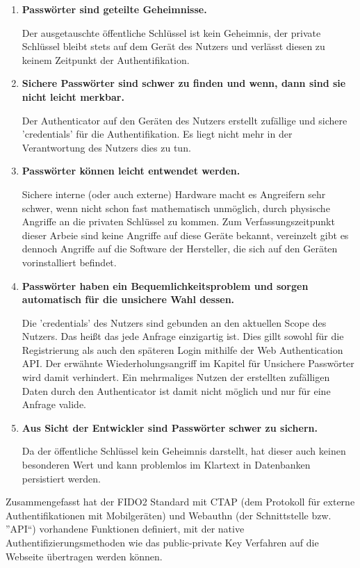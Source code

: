 \begin{enumerate} 
\item \textbf{Passwörter sind geteilte Geheimnisse.}

Der ausgetauschte öffentliche Schlüssel ist kein Geheimnis, der private Schlüssel bleibt stets auf dem Gerät des Nutzers und verlässt diesen zu keinem Zeitpunkt der Authentifikation.

\item \textbf{Sichere Passwörter sind schwer zu finden und wenn, dann sind sie nicht leicht merkbar.}

Der Authenticator auf den Geräten des Nutzers erstellt zufällige und sichere 'credentials' für die Authentifikation. Es liegt nicht mehr in der Verantwortung des Nutzers dies zu tun.

\item \textbf{Passwörter können leicht entwendet werden.}

Sichere interne (oder auch externe) Hardware macht es Angreifern sehr schwer, wenn nicht schon fast mathematisch unmöglich, durch physische Angriffe an die privaten Schlüssel zu kommen. Zum Verfassungszeitpunkt dieser Arbeie sind keine Angriffe auf diese Geräte bekannt, vereinzelt gibt es dennoch Angriffe auf die Software der Hersteller, die sich auf den Geräten vorinstalliert befindet.

\item \textbf{Passwörter haben ein Bequemlichkeitsproblem und sorgen automatisch für die unsichere Wahl dessen.}

Die 'credentials' des Nutzers sind gebunden an den aktuellen Scope des Nutzers. Das heißt das jede Anfrage einzigartig ist. Dies gillt sowohl für die Registrierung als auch den späteren Login mithilfe der Web Authentication API. Der erwähnte Wiederholungsangriff im Kapitel für Unsichere Passwörter wird damit verhindert. Ein mehrmaliges Nutzen der erstellten zufälligen Daten durch den Authenticator ist damit nicht möglich und nur für eine Anfrage valide.

\item \textbf{Aus Sicht der Entwickler sind Passwörter schwer zu sichern.}

Da der öffentliche Schlüssel kein Geheimnis darstellt, hat dieser auch keinen besonderen Wert und kann problemlos im Klartext in Datenbanken persistiert werden.
\end{enumerate}

Zusammengefasst hat der FIDO2 Standard mit CTAP (dem Protokoll für externe Authentifikationen mit Mobilgeräten) und Webauthn (der Schnittstelle bzw. ''API``) vorhandene Funktionen definiert, mit der native Authentifizierungsmethoden wie das public-private Key Verfahren auf die Webseite übertragen werden können.
